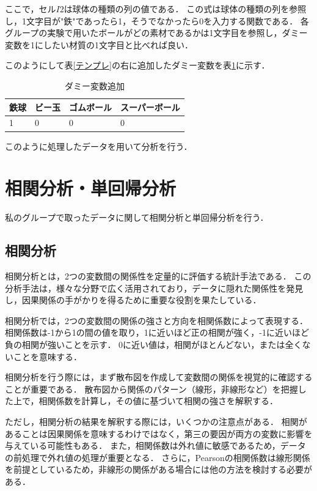 \documentclass[titlepage,a4paper]{jsarticle}
\begin{document}
ここで，セル$I2$は球体の種類の列の値である．
この式は球体の種類の列を参照し，1文字目が"鉄"であったら1，そうでなかったら0を入力する関数である．
各グループの実験で用いたボールがどの素材であるかは1文字目を参照し，ダミー変数を1にしたい材質の1文字目と比べれば良い．

このようにして表\ref{テンプレ}の右に追加したダミー変数を表\ref{ダミー}に示す．
\begin{table}[H]
  \centering
  \caption{ダミー変数追加}
  \label{ダミー}
  \begin{tabular}{llll}
    鉄球 & ビー玉 & ゴムボール & スーパーボール \\\hline\hline
    1  & 0   & 0     & 0       \\\hline
  \end{tabular}
\end{table}

このように処理したデータを用いて分析を行う．


\section{相関分析・単回帰分析}\label{相関}
私のグループで取ったデータに関して相関分析と単回帰分析を行う．
\subsection{相関分析}
相関分析とは，2つの変数間の関係性を定量的に評価する統計手法である．
この分析手法は，様々な分野で広く活用されており，データに隠れた関係性を発見し，因果関係の手がかりを得るために重要な役割を果たしている．

相関分析では，2つの変数間の関係の強さと方向を相関係数によって表現する．
相関係数は-1から1の間の値を取り，1に近いほど正の相関が強く，-1に近いほど負の相関が強いことを示す．
0に近い値は，相関がほとんどない，または全くないことを意味する．

相関分析を行う際には，まず散布図を作成して変数間の関係を視覚的に確認することが重要である．
散布図から関係のパターン（線形，非線形など）を把握した上で，相関係数を計算し，その値に基づいて相関の強さを解釈する．

ただし，相関分析の結果を解釈する際には，いくつかの注意点がある．
相関があることは因果関係を意味するわけではなく，第三の要因が両方の変数に影響を与えている可能性もある．
また，相関係数は外れ値に敏感であるため，データの前処理で外れ値の処理が重要となる．
さらに，Pearsonの相関係数は線形関係を前提としているため，非線形の関係がある場合には他の方法を検討する必要がある．
\end{document}
